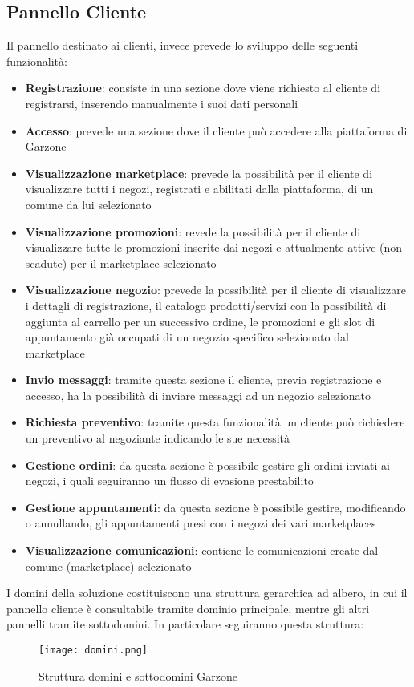 \subsection{Pannello Cliente} Il pannello destinato ai clienti, invece prevede lo sviluppo delle seguenti funzionalità:
\begin{itemize}
    \item \textbf{Registrazione}: consiste in una sezione dove viene richiesto al cliente di registrarsi, inserendo manualmente i suoi dati personali
    \item \textbf{Accesso}: prevede una sezione dove il cliente può accedere alla piattaforma di Garzone
    \item \textbf{Visualizzazione marketplace}: prevede la possibilità per il cliente di visualizzare tutti i negozi, registrati e abilitati dalla piattaforma, di un comune da lui selezionato
    \item \textbf{Visualizzazione promozioni}: revede la possibilità per il cliente di visualizzare tutte le promozioni inserite dai negozi  e attualmente attive (non scadute) per il marketplace selezionato
    \item \textbf{Visualizzazione negozio}: prevede la possibilità per il cliente di visualizzare i dettagli di registrazione, il catalogo prodotti/servizi con la possibilità di aggiunta al carrello per un successivo ordine, le promozioni e gli slot di appuntamento già occupati di un negozio specifico selezionato dal marketplace
    \item \textbf{Invio messaggi}: tramite questa sezione il cliente, previa registrazione e accesso, ha la possibilità di inviare messaggi ad un negozio selezionato
    \item \textbf{Richiesta preventivo}: tramite questa funzionalità un cliente può richiedere un preventivo al negoziante indicando le sue necessità
    \item \textbf{Gestione ordini}: da questa sezione è possibile gestire gli ordini inviati ai negozi, i quali seguiranno un flusso di evasione prestabilito
    \item \textbf{Gestione appuntamenti}: da questa sezione è possibile gestire, modificando o annullando, gli appuntamenti presi con i negozi dei vari marketplaces
    \item \textbf{Visualizzazione comunicazioni}: contiene le comunicazioni create dal comune (marketplace) selezionato
\end{itemize}

I domini della soluzione costituiscono una struttura gerarchica ad albero, in cui il pannello cliente è consultabile tramite dominio principale, mentre gli altri pannelli tramite sottodomini. In particolare seguiranno questa struttura:
\begin{figure}[!htb]
    \centering
    \texttt{[image: domini.png]}
    \caption{Struttura domini e sottodomini Garzone}
\end{figure}